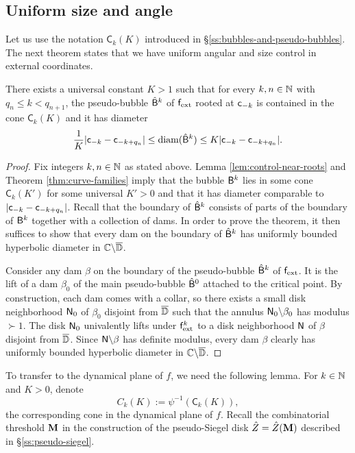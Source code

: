 \documentclass{amsart}
\begin{document}
\subsection{Uniform size and angle}
\label{ss:uniform-size}
Let us use the notation $\mathsf{C}_k(K)$ introduced in \S\ref{ss:bubbles-and-pseudo-bubbles}. 
The next theorem states that we have uniform angular and size control in external coordinates.

\begin{theorem}
\label{thm:size-external-pseudo-bubbles}
    There exists a universal constant $K>1$ such that for every $k,n \in \mathbb{N}$ with $q_n \leq k < q_{n+1}$, the pseudo-bubble $\hat{\mathsf{B}}^k$ of $\mathsf{f}_{\textnormal{ext}}$ rooted at $\mathsf{c}_{-k}$ is contained in the cone $\mathsf{C}_k(K)$ and it has diameter 
        \[
        \frac{1}{K}|\mathsf{c}_{-k} - \mathsf{c}_{-k+q_{n}}| \leq \textnormal{diam}(\hat{\mathsf{B}}^k) \leq K |\mathsf{c}_{-k} - \mathsf{c}_{-k+q_{n}}|.
        \]
\end{theorem}

\begin{proof}
    Fix integers $k,n \in \mathbb{N}$ as stated above.
    Lemma \ref{lem:control-near-roots} and Theorem \ref{thm:curve-families} imply that the bubble $\mathsf{B}^k$ lies in some cone $\mathsf{C}_k(K')$ for some universal $K'>0$ and that it has diameter comparable to $|\mathsf{c}_{-k}-\mathsf{c}_{-k+q_n}|$. Recall that the boundary of $\hat{\mathsf{B}}^k$ consists of parts of the boundary of $\mathsf{B}^k$ together with a collection of dams. In order to prove the theorem, it then suffices to show that every dam on the boundary of $\hat{\mathsf{B}}^k$ has uniformly bounded hyperbolic diameter in $\mathbb{C} \backslash \overline{\mathbb{D}}$.
    
    Consider any dam $\beta$ on the boundary of the pseudo-bubble $\hat{\mathsf{B}}^k$ of $\mathsf{f}_{\textnormal{ext}}$. 
    It is the lift of a dam $\beta_0$ of the main pseudo-bubble $\hat{\mathsf{B}}^0$ attached to the critical point. 
    By construction, each dam comes with a collar, so there exists a small disk neighborhood $\mathsf{N}_0$ of $\beta_0$ disjoint from $\overline{\mathbb{D}}$ such that the annulus $\mathsf{N}_0 \backslash \beta_0$ has modulus $ \succ 1$. 
    The disk $\mathsf{N}_0$ univalently lifts under $\mathsf{f}_{\textnormal{ext}}^k$ to a disk neighborhood $\mathsf{N}$ of $\beta$ disjoint from $\overline{\mathbb{D}}$. 
    Since $\mathsf{N} \backslash \beta$ has definite modulus, every dam $\beta$ clearly has uniformly bounded hyperbolic diameter in $\mathbb{C} \backslash \overline{\mathbb{D}}$.
\end{proof}

To transfer to the dynamical plane of $f$, we need the following lemma. 
For $k \in \mathbb{N}$ and $K>0$, denote 
\[
C_k(K) := \psi^{-1}(\mathsf{C}_k(K)),
\]
the corresponding cone in the dynamical plane of $f$.
Recall the combinatorial threshold $\mathbf{M}$ in the construction of the pseudo-Siegel disk $\hat{Z} = \hat{Z}(\mathbf{M})$ described in \S\ref{ss:pseudo-siegel}. 
\end{document}
